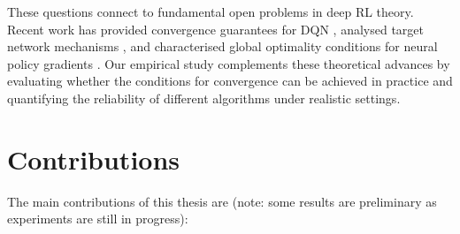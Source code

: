 \documentclass[12pt,a4paper]{report}
\begin{document}
These questions connect to fundamental open problems in deep RL theory. Recent work has provided convergence guarantees for DQN \cite{zhang2023convergence}, analysed target network mechanisms \cite{zhang2021breaking}, and characterised global optimality conditions for neural policy gradients \cite{wang2019neural}. Our empirical study complements these theoretical advances by evaluating whether the conditions for convergence can be achieved in practice and quantifying the reliability of different algorithms under realistic settings.

\section{Contributions}

The main contributions of this thesis are (note: some results are preliminary as experiments are still in progress):
\end{document}
